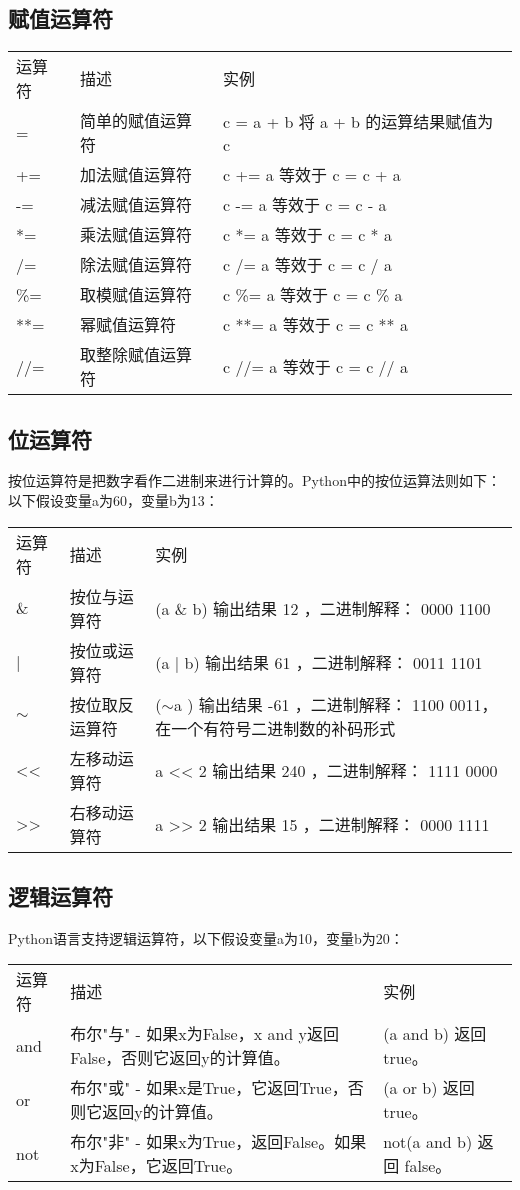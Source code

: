 \subsection{赋值运算符}
\begin{tabular}{l|l|l}
运算符&	描述&	实例\\
=&	简单的赋值运算符&	c = a + b 将 a + b 的运算结果赋值为 c\\
+=&	加法赋值运算符&	c += a 等效于 c = c + a\\
-=&	减法赋值运算符&	c -= a 等效于 c = c - a\\
*=&	乘法赋值运算符&	c *= a 等效于 c = c * a\\
/=&	除法赋值运算符&	c /= a 等效于 c = c / a\\
\%=&	取模赋值运算符&	c \%= a 等效于 c = c \% a\\
**=&	幂赋值运算符&	c **= a 等效于 c = c ** a\\
//=&	取整除赋值运算符&	c //= a 等效于 c = c // a
\end{tabular}


\subsection{位运算符}
按位运算符是把数字看作二进制来进行计算的。Python中的按位运算法则如下：
以下假设变量a为60，变量b为13：

\begin{tabular}{l|l|l}
运算符&	描述&	实例\\
\& &	按位与运算符&	 (a \& b) 输出结果 12 ，二进制解释： 0000 1100\\
|&	按位或运算符&	(a | b) 输出结果 61 ，二进制解释： 0011 1101\\
$\sim$	&按位取反运算符&	($\sim$a ) 输出结果 -61 ，二进制解释： 1100 0011， 在一个有符号二进制数的补码形式\\
<<&	左移动运算符	&a << 2 输出结果 240 ，二进制解释： 1111 0000\\
>>&	右移动运算符	&a >> 2 输出结果 15 ，二进制解释： 0000 1111
\end{tabular}


\subsection{逻辑运算符}
Python语言支持逻辑运算符，以下假设变量a为10，变量b为20：

\begin{tabular}{l|l|l}
运算符&	描述&	实例\\
and&	布尔"与" - 如果x为False，x and y返回False，否则它返回y的计算值。&	(a and b) 返回 true。\\
or&	布尔"或" - 如果x是True，它返回True，否则它返回y的计算值。&	(a or b) 返回 true。\\
not	&布尔"非" - 如果x为True，返回False。如果x为False，它返回True。&	not(a and b) 返回 false。
\end{tabular}


